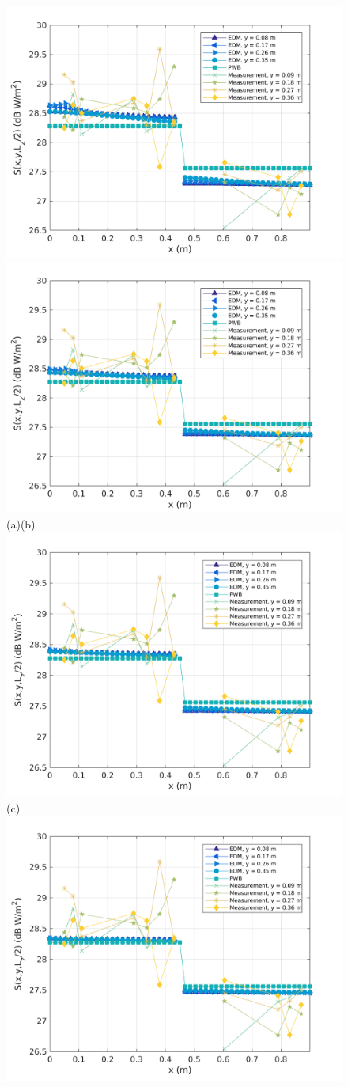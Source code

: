 \documentclass[a4paper]{article}
\numberwithin{equation}{section}
\begin{document}
\begin{figure}[hp]
\begin{center}
\includegraphics[width=0.49\linewidth]{figures/DDM-EEBC_3D_DU_PowerDensityProfileXMeas_JX_k0_5}
\includegraphics[width=0.49\linewidth]{figures/DDM-EEBC_3D_DU_PowerDensityProfileXMeas_JX_k0_75}\\
{\footnotesize (a)\hspace{75mm}(b)}\\
\includegraphics[width=0.5\linewidth]{figures/DDM-EEBC_3D_DU_PowerDensityProfileXMeas_JX_k1_0}\\
{\footnotesize (c)}\\
\includegraphics[width=0.49\linewidth]{figures/DDM-EEBC_3D_DU_PowerDensityProfileXMeas_JX_k1_5}

\end{center}
\end{figure}
\end{document}
